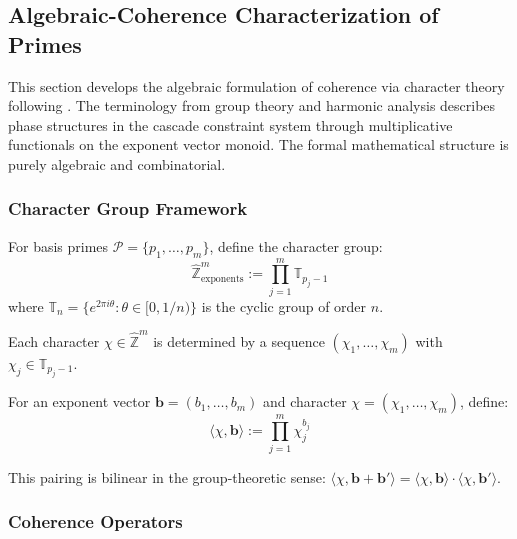 \subsection{Algebraic-Coherence Characterization of Primes}
\label{subsec:quantum-coherence}

This section develops the algebraic formulation of coherence via character theory following \cite{Serre1977, Dummit2004}. The terminology from group theory and harmonic analysis describes phase structures in the cascade constraint system through multiplicative functionals on the exponent vector monoid. The formal mathematical structure is purely algebraic and combinatorial.

\subsubsection{Character Group Framework}

\begin{definition}
For basis primes $\mathcal{P} = \{p_1, \ldots, p_m\}$, define the character group:
\begin{equation}
\hat{\mathbb{Z}}^m_{\text{exponents}} := \prod_{j=1}^m \mathbb{T}_{p_j-1}
\end{equation}
where $\mathbb{T}_n = \{e^{2\pi i \theta} : \theta \in [0, 1/n)\}$ is the cyclic group of order $n$.

Each character $\chi \in \hat{\mathbb{Z}}^m$ is determined by a sequence $(\chi_1, \ldots, \chi_m)$ with $\chi_j \in \mathbb{T}_{p_j-1}$.
\end{definition}

\begin{definition}
For an exponent vector $\mathbf{b} = (b_1, \ldots, b_m)$ and character $\chi = (\chi_1, \ldots, \chi_m)$, define:
\begin{equation}
\langle \chi, \mathbf{b} \rangle := \prod_{j=1}^m \chi_j^{b_j}
\end{equation}

This pairing is bilinear in the group-theoretic sense: $\langle \chi, \mathbf{b} + \mathbf{b}' \rangle = \langle \chi, \mathbf{b} \rangle \cdot \langle \chi, \mathbf{b}' \rangle$.
\end{definition}

\subsubsection{Coherence Operators}

